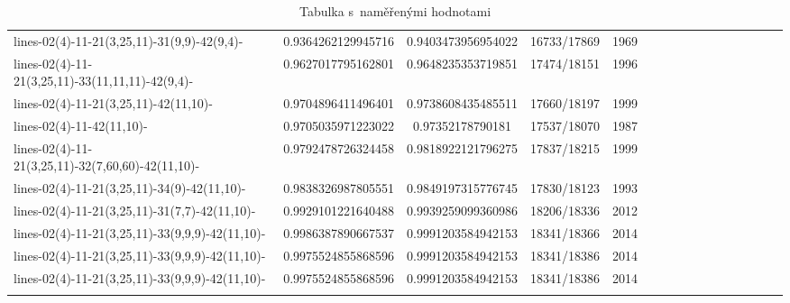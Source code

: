 \documentclass[12pt,oneside]{report}			%
\begin{document}
\begin{landscape}
\begin{longtable}{ | p{5cm} | *{15}{c|}}
lines-02(4)-11-21(3,25,11)-31(9,9)-42(9,4)-       & 0.9364262129945716  & 0.9403473956954022  & 16733/17869 & 1969 \\
lines-02(4)-11-21(3,25,11)-33(11,11,11)-42(9,4)-   & 0.9627017795162801  & 0.9648235353719851  & 17474/18151 & 1996 \\
lines-02(4)-11-21(3,25,11)-42(11,10)-             & 0.9704896411496401  & 0.9738608435485511  & 17660/18197 & 1999 \\
lines-02(4)-11-42(11,10)-                         & 0.9705035971223022  & 0.97352178790181    & 17537/18070 & 1987 \\
lines-02(4)-11-21(3,25,11)-32(7,60,60)-42(11,10)- & 0.9792478726324458  & 0.9818922121796275  & 17837/18215 & 1999 \\
lines-02(4)-11-21(3,25,11)-34(9)-42(11,10)-       & 0.9838326987805551  & 0.9849197315776745  & 17830/18123 & 1993 \\
lines-02(4)-11-21(3,25,11)-31(7,7)-42(11,10)-     & 0.9929101221640488  & 0.9939259099360986  & 18206/18336 & 2012 \\
lines-02(4)-11-21(3,25,11)-33(9,9,9)-42(11,10)-   & 0.9986387890667537  & 0.9991203584942153  & 18341/18366 & 2014 \\
lines-02(4)-11-21(3,25,11)-33(9,9,9)-42(11,10)-   & 0.9975524855868596  & 0.9991203584942153  & 18341/18386 & 2014 \\
lines-02(4)-11-21(3,25,11)-33(9,9,9)-42(11,10)-   & 0.9975524855868596  & 0.9991203584942153  & 18341/18386 & 2014\\
\hline
\caption{Tabulka s~naměřenými hodnotami}
\label{table:komplet}
\end{longtable}
\end{landscape}
\end{document}

